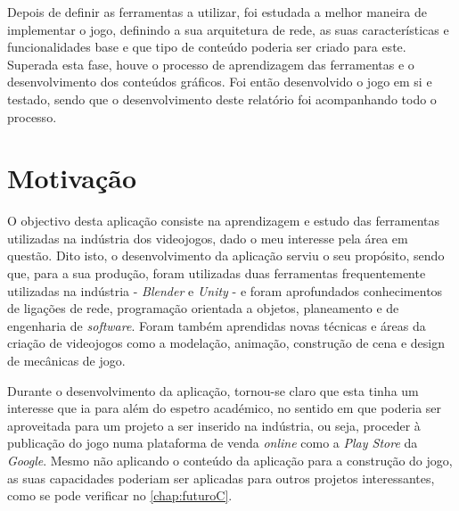 Depois de definir as ferramentas a utilizar, foi estudada a melhor maneira de implementar o jogo, definindo a sua arquitetura de rede, as suas características e funcionalidades base e que tipo de conteúdo poderia ser criado para este. 
Superada esta fase, houve o processo de aprendizagem das ferramentas e o desenvolvimento dos conteúdos gráficos. Foi então desenvolvido o jogo em si e testado, sendo que o desenvolvimento deste relatório foi acompanhando todo o processo.




\section{Motivação}
\label{sec:DP}
O objectivo desta aplicação consiste na aprendizagem e estudo das ferramentas utilizadas na indústria dos videojogos, dado o meu interesse pela área em questão. Dito isto, o desenvolvimento da aplicação serviu o seu propósito, sendo que, para a sua produção, foram utilizadas duas ferramentas frequentemente utilizadas na indústria - \emph{Blender} e \emph{Unity} - e foram aprofundados conhecimentos de ligações de rede, programação orientada a objetos, planeamento e de engenharia de \textit{software}. Foram também aprendidas novas técnicas e áreas da criação de videojogos como a modelação, animação, construção de cena e design de mecânicas de jogo.

Durante o desenvolvimento da aplicação, tornou-se claro que esta tinha um interesse que ia para além do espetro académico, no sentido em que poderia ser aproveitada para um projeto a ser inserido na indústria, ou seja, proceder à publicação do jogo numa plataforma de venda \textit{online} como a \emph{Play Store} da \emph{Google}. 
Mesmo não aplicando o conteúdo da aplicação para a construção do jogo, as suas capacidades poderiam ser aplicadas para outros projetos interessantes, como se pode verificar no \autoref{chap:futuroC}.

